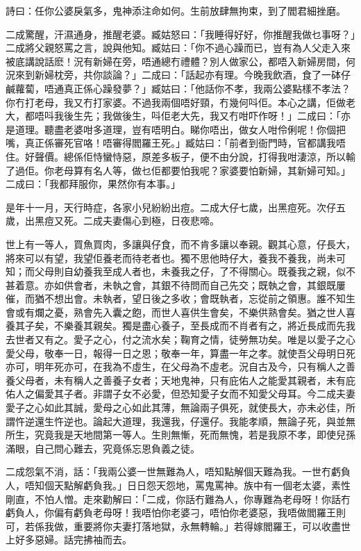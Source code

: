 \documentclass[a5paper, 12pt, openany]{book} %
\begin{document}
	詩曰：任你公婆戾氣多，鬼神添注命如何。生前放肆無拘束，到了閻君細挫磨。

	二成驚醒，汗濕通身，推醒老婆。臧姑怒曰：「我睡得好好，你推醒我做乜事呀？」二成將父親怒罵之言，說與他知。臧姑曰：「你不過心躁而已，豈有為人父走入來被底講說話麽！況有新婦在旁，唔通總冇禮體？別人做家公，都唔入新婦房間，何況來到新婦枕旁，共你談論？」二成曰：「話起亦有理。今晚我飲酒，食了一砵仔鹹蘿蔔，唔通真正係心躁發夢？」臧姑曰：「他話你不孝，我兩公婆點樣不孝法？你冇打老母，我又冇打家婆。不過我兩個唔好頸，冇幾何呌佢。本心之講，佢做老大，都唔呌我後生先；我做後生，呌佢老大先，我又冇咁吓作呀！」二成曰：「亦是道理。聽盡老婆咁多道理，豈有唔明白。睇你唔出，做女人咁伶俐呢！你個把嘴，真正係審死官咯！唔審得閻羅王死。」臧姑曰：「前者到衙門時，官都講我唔住。好聲價。總係佢恃蠻恃惡，原差多板子，便不由分說，打得我咁淒涼，所以輸了過佢。你老母算有名人等，做乜佢都要怕我呢？家婆要怕新婦，其新婦可知。」二成曰：「我都拜服你，果然你有本事。」

	是年十一月，天行時症，各家小兒紛紛出痘。二成大仔七歲，出黑痘死。次仔五歲，出黑痘又死。二成夫妻傷心到極，日夜悲啼。

	世上有一等人，買魚買肉，多讓與仔食，而不肯多讓以奉親。觀其心意，仔長大，將來可以有望，我望佢養老而待老者也。獨不思他時仔大，養我不養我，尚未可知；而父母則自幼養我至成人者也，未養我之仔，了不得關心。既養我之親，似不甚着意。亦如供會者，未執之會，其銀不待問而自己先交；既執之會，其銀既屢催，而猶不想出會。未執者，望日後之多收；會既執者，忘從前之領惠。誰不知生會或有爛之憂，熟會先入囊之飽，而世人喜供生會矣，不樂供熟會矣。猶之世人喜養其子矣，不樂養其親矣。獨是盡心養子，至長成而不肖者有之，將近長成而先我去世者又有之。愛子之心，付之流水矣；鞠育之情，徒勞無功矣。唯是以愛子之心愛父母，敬奉一日，報得一日之恩；敬奉一年，算盡一年之孝。就使吾父母明日死亦可，明年死亦可，在我為不虛生，在父母為不虛老。況自古及今，只有稱人之善養父母者，未有稱人之善養子女者；天地鬼神，只有庇佑人之能愛其親者，未有庇佑人之偏愛其子者。非謂子女不必愛，但恐知愛子女而不知愛父母耳。今二成夫妻愛子之心如此其誠，愛母之心如此其薄，無論兩子俱死，就使長大，亦未必佳，所謂忤逆還生忤逆也。論起大道理，我還我，仔還仔。我能孝順，無論子死，與並無所生，究竟我是天地間第一等人。生則無慚，死而無愧，若是我原不孝，即使兒孫滿眼，自己問心難去，究竟係忘恩負義之徒。

	二成怨氣不消，話：「我兩公婆一世無難為人，唔知點解個天難為我。一世冇虧負人，唔知個天點解虧負我。」日日怨天怨地，罵鬼罵神。族中有一個老太婆，素性剛直，不怕人憎。走來勸解曰：「二成，你話冇難為人，你專難為老母呀！你話冇虧負人，你偏有虧負老母呀！我唔怕你老婆刁，唔怕你老婆惡，我唔做閻羅王則可，若係我做，重要將你夫妻打落地獄，永無轉輪。」若得嫁閻羅王，可以收盡世上好多惡婦。話完拂袖而去。
\end{document}
